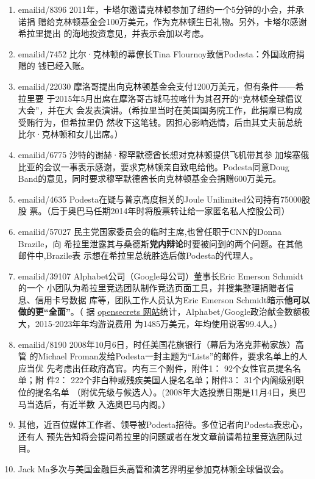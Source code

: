 \begin{enumerate}
\item emailid/8396 2011年，卡塔尔邀请克林顿参加了纽约一个5分钟的小会，并承诺捐
  赠给克林顿基金会100万美元，作为克林顿生日礼物。另外，卡塔尔感谢希拉里提出
  的海地投资意见，并表示会加以考虑。

\item emailid/7452 比尔·克林顿的幕僚长Tina Flournoy致信Podesta：外国政府捐赠的
  钱已经入账。

\item emailid/22030 摩洛哥提出向克林顿基金会支付1200万美元，但有条件——希拉里要
  于2015年5月出席在摩洛哥古城马拉喀什为其召开的“克林顿全球倡议大会”，并在大
  会发表演讲。（希拉里当时在美国国务院工作，此捐赠已构成受贿行为，但希拉里仍
  然收下这笔钱。因担心影响选情，后由其丈夫前总统比尔·克林顿和女儿出席。）

\item emailid/6775 沙特的谢赫·穆罕默德酋长想对克林顿提供飞机带其参
  加埃塞俄比亚的会议一事表示感谢，要求克林顿亲自致电给他。Podesta同意Doug
  Band的意见，同时要求穆罕默德酋长向克林顿基金会捐赠600万美元。

\item emailid/4635 Podesta在疑与普京高度相关的Joule Unilimited公司持有75000股股
  票。（后于奥巴马任期2014年时将股票转让给一家匿名私人控股公司）

\item emailid/57027 民主党国家委员会的临时主席,也曾任职于CNN的Donna Brazile，向
  希拉里泄露其与桑德斯\textbf{党内辩论}时要被问到的两个问题。在其他邮件中,Brazile表
  示想在希拉里总统胜选后做Podesta的代理人。

\item emailid/39107 Alphabet公司（Google母公司）董事长Eric Emerson Schmidt的一个
  小团队为希拉里竞选团队制作竞选页面工具，并搜集整理捐赠者信息、信用卡号数据
  库等，团队工作人员认为Eric Emerson Schmidt暗示\textbf{他可以做的更“全面”}。（
  据
  \href{https://www.opensecrets.org/federal-lobbying/clients/summary?cycle=2019&id=D000067823}{opensecrets
    网站}统计，Alphabet/Google政治献金数额极大，2015-2023年年均游说费用
  为1485万美元，年均使用说客99.4人。）

\item emailid/8190 2008年10月6日，时任美国花旗银行（幕后为洛克菲勒家族）高管
  的Michael Froman发给Podesta一封主题为“Lists”的邮件，要求名单上的人应当优
  先考虑出任政府高官。内有三个附件，附件1： 92个女性官员提名名单；附
  件2： 222个非白种或残疾美国人提名名单；附件3： 31个内阁级别职位的提名名单
  （附优先级与候选人）。(2008年大选投票日期是11月4日，奥巴马当选后，有近半数
  入选奥巴马内阁。）

\item 其他，近百位媒体工作者、领导被Podesta招待。多位记者向Podesta表忠心，还有人
  预先告知将会提问希拉里的问题或者在发文章前请希拉里竞选团队过目。

\item Jack Ma多次与美国金融巨头高管和演艺界明星参加克林顿全球倡议会。
\end{enumerate}



